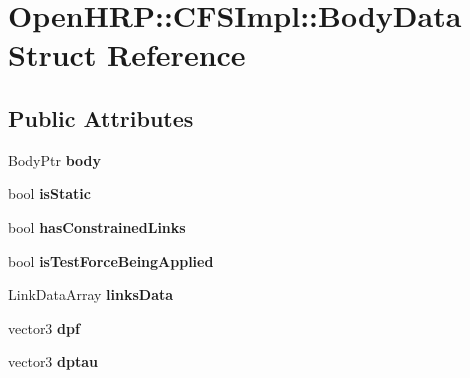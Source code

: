\hypertarget{structOpenHRP_1_1CFSImpl_1_1BodyData}{\section{Open\-H\-R\-P\-:\-:C\-F\-S\-Impl\-:\-:Body\-Data Struct Reference}
\label{structOpenHRP_1_1CFSImpl_1_1BodyData}
}
\subsection*{Public Attributes}
\begin{DoxyCompactItemize}
\item 
\hypertarget{structOpenHRP_1_1CFSImpl_1_1BodyData_a4697c57c13e1dd7c1a7c4a1fbb60f3c2}{Body\-Ptr {\bfseries body}}\label{structOpenHRP_1_1CFSImpl_1_1BodyData_a4697c57c13e1dd7c1a7c4a1fbb60f3c2}

\item 
\hypertarget{structOpenHRP_1_1CFSImpl_1_1BodyData_a706ba6649747cbad7b98e4c8ced4f19f}{bool {\bfseries is\-Static}}\label{structOpenHRP_1_1CFSImpl_1_1BodyData_a706ba6649747cbad7b98e4c8ced4f19f}

\item 
\hypertarget{structOpenHRP_1_1CFSImpl_1_1BodyData_ad69a87d6e6fd97134b135fc106bcbd60}{bool {\bfseries has\-Constrained\-Links}}\label{structOpenHRP_1_1CFSImpl_1_1BodyData_ad69a87d6e6fd97134b135fc106bcbd60}

\item 
\hypertarget{structOpenHRP_1_1CFSImpl_1_1BodyData_aa9ffddad678bbc5bb69e27687416dbd4}{bool {\bfseries is\-Test\-Force\-Being\-Applied}}\label{structOpenHRP_1_1CFSImpl_1_1BodyData_aa9ffddad678bbc5bb69e27687416dbd4}

\item 
\hypertarget{structOpenHRP_1_1CFSImpl_1_1BodyData_ad87536dff2fd3b65121cf0ba4dfab5fe}{Link\-Data\-Array {\bfseries links\-Data}}\label{structOpenHRP_1_1CFSImpl_1_1BodyData_ad87536dff2fd3b65121cf0ba4dfab5fe}

\item 
\hypertarget{structOpenHRP_1_1CFSImpl_1_1BodyData_af6f431288082cec128737c755025a240}{vector3 {\bfseries dpf}}\label{structOpenHRP_1_1CFSImpl_1_1BodyData_af6f431288082cec128737c755025a240}

\item 
\hypertarget{structOpenHRP_1_1CFSImpl_1_1BodyData_a456ad0dfb3b3dbe207015926bc717826}{vector3 {\bfseries dptau}}\label{structOpenHRP_1_1CFSImpl_1_1BodyData_a456ad0dfb3b3dbe207015926bc717826}


\end{DoxyCompactItemize}

